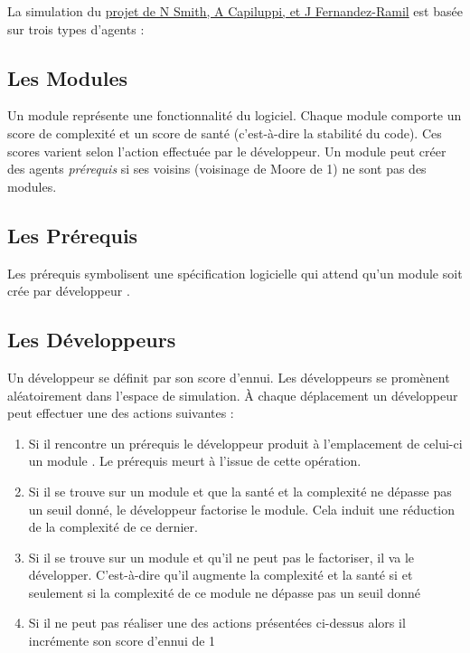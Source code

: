 \documentclass{article}
\begin{document}
La simulation du \href{http://oro.open.ac.uk/4698/1/}{projet de N Smith, A Capiluppi, et J Fernandez-Ramil} est basée sur trois types d'agents :

\subsection{Les Modules}
\label{sec:modul}
Un module représente une fonctionnalité du logiciel. Chaque module
comporte un score de complexité et un score de santé (c'est-à-dire la
stabilité du code). Ces scores varient selon l'action effectuée par le
développeur. Un module peut créer des agents \textit{prérequis} \up{\ref{sec:prer}} si ses voisins (voisinage de Moore de 1) ne sont pas des modules.

\newpage

\subsection{Les Prérequis}
\label{sec:prer}
Les prérequis symbolisent une spécification logicielle qui attend
qu'un module \up{\ref{sec:modul}} soit crée par développeur \up{\ref{sec:dev}}.

\subsection{Les Développeurs}
\label{sec:dev}
Un développeur se définit par son score d'ennui. Les développeurs se promènent aléatoirement dans l'espace de simulation. À chaque déplacement un développeur peut effectuer une des actions suivantes :

\begin{enumerate}
  \item Si il rencontre un prérequis \up{\ref{sec:prer}} le développeur
    produit à l'emplacement de celui-ci un module \up{\ref{sec:modul}}. Le prérequis meurt à l'issue de cette opération.
  \item{Si il se trouve sur un module et que la santé et la complexité ne dépasse pas un seuil donné, le développeur factorise le module. Cela induit une réduction de la complexité de ce dernier.}
  \item{Si il se trouve sur un module et qu'il ne peut pas le factoriser, il va le développer. C'est-à-dire qu'il augmente la complexité et la santé si et seulement si la complexité de ce module ne dépasse pas un seuil donné}
  \item{Si il ne peut pas réaliser une des actions présentées ci-dessus alors il incrémente son score d'ennui de 1}
\end{enumerate}
\end{document}
